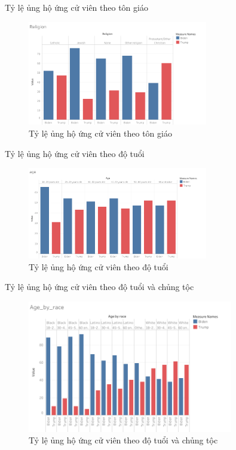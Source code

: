 \documentclass[10pt]{beamer}
\theoremstyle{remark}
\theoremstyle{definition}
\begin{document}
\begin{frame}{Tỷ lệ ủng hộ ứng cử viên theo tôn giáo}
	\begin{figure}[h!]
        \centering
        \includegraphics[width=0.7\textwidth]{figures/Religion.png}
        \caption{Tỷ lệ ủng hộ ứng cử viên theo tôn giáo}
    \end{figure}
\end{frame}

\begin{frame}{Tỷ lệ ủng hộ ứng cử viên theo độ tuổi}
	\begin{figure}[h!]
        \centering
        \includegraphics[width=0.7\textwidth]{figures/age.png}
        \caption{Tỷ lệ ủng hộ ứng cử viên theo độ tuổi}
    \end{figure}
\end{frame}


\begin{frame}{Tỷ lệ ủng hộ ứng cử viên theo độ tuổi và chủng tộc}
	\begin{figure}[h!]
        \centering
        \includegraphics[width=0.8\textwidth]{figures/Age_by_race.png}
        \caption{Tỷ lệ ủng hộ ứng cử viên theo độ tuổi và chủng tộc}
    \end{figure}
\end{frame}
\end{document}
